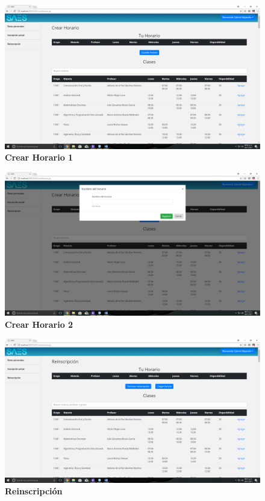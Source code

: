 \begin{figure}[H]
  \centering
    \includegraphics[scale=0.2]{project/images/6.png}
  \caption{\textbf{Crear Horario 1}}
\end{figure}
\begin{figure}[H]
  \centering
    \includegraphics[scale=0.2]{project/images/7.png}
  \caption{\textbf{Crear Horario 2}}
\end{figure}
\begin{figure}[H]
  \centering
    \includegraphics[scale=0.2]{project/images/8.png}
  \caption{\textbf{Reinscripción}}
\end{figure}
